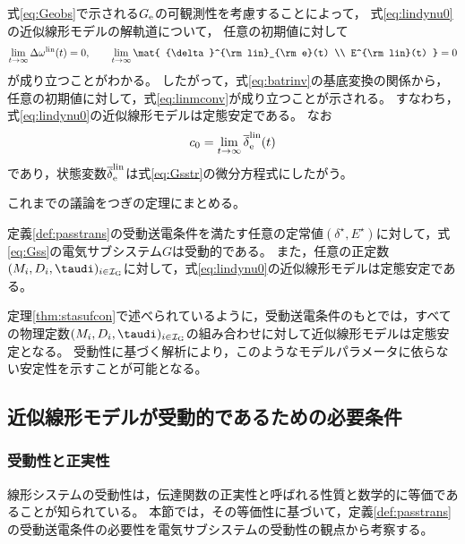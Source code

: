 \documentclass[tombow,dvipdfmx]{corona-a5-1.1}
\begin{document}
式\ref{eq:Geobs}で示される$G_{\rm e}$の可観測性を考慮することによって，
式\ref{eq:lindynu0}の近似線形モデルの解軌道について，
任意の初期値に対して
\begin{align}\label{eq:allzero}
\lim_{t\rightarrow \infty} \Delta \omega^{\rm lin}(t)  =0,\qquad
\lim_{t\rightarrow \infty} \mat{
{\delta}^{\rm lin}_{\rm e}(t)   \\
E^{\rm lin}(t)  
}
 =0
\end{align}
が成り立つことがわかる。
したがって，式\ref{eq:batrinv}の基底変換の関係から，任意の初期値に対して，式\ref{eq:linmconv}が成り立つことが示される。
すなわち，式\ref{eq:lindynu0}の近似線形モデルは定態安定である。
なお
\[
c_0 = \lim_{t\rightarrow \infty}\overline{\delta}^{\rm lin}_{\rm e}(t)
\]
であり，状態変数$\overline{\delta}^{\rm lin}_{\rm e}$は式\ref{eq:Gsstr}の微分方程式にしたがう。

これまでの議論をつぎの定理にまとめる。

\begin{定理}[受動性に基づく近似線形モデルの定態安定性]\label{thm:stasufcon}
定義\ref{def:passtrans}の受動送電条件を満たす任意の定常値$(\delta^{\star},E^{\star})$に対して，式\ref{eq:Gss}の電気サブシステム$G$は受動的である。
また，任意の正定数$(M_i,D_i,\taudi )_{i \in \mathcal{I}_{\rm G}}$に対して，式\ref{eq:lindynu0}の近似線形モデルは定態安定である。
\end{定理}

定理\ref{thm:stasufcon}で述べられているように，受動送電条件のもとでは，すべての物理定数$(M_i,D_i,\taudi )_{i \in \mathcal{I}_{\rm G}}$の組み合わせに対して近似線形モデルは定態安定となる。
受動性に基づく解析により，このようなモデルパラメータに依らない安定性を示すことが可能となる。



\subsection{近似線形モデルが受動的であるための必要条件\advanced}\label{sec:nesconana}

\smallskip
\subsubsection{受動性と正実性}

線形システムの受動性は，伝達関数の正実性と呼ばれる性質と数学的に等価であることが知られている。
本節では，その等価性に基づいて，定義\ref{def:passtrans}の受動送電条件の必要性を電気サブシステムの受動性の観点から考察する。
\end{document}
